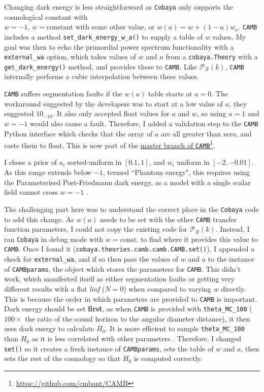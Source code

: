 \documentclass{article}
\begin{document}
Changing dark energy is less straightforward as \texttt{Cobaya} only supports the cosmological constant with \\ $w=-1$, $w = \textrm{constant}$ with some other value, or $w(a) = w+(1-a)w_a$. \texttt{CAMB} includes a method \texttt{set\_dark\_energy\_w\_a()} to supply a table of $w$ values. My goal was then to echo the primordial power spectrum functionality with a \texttt{external\_wa} option, which takes values of $w$ and $a$ from a \texttt{cobaya.Theory} with a \texttt{get\_dark\_energy()} method, and provides these to \texttt{CAMB}. Like $\mathcal P_\mathcal R(k)$, \texttt{CAMB} internally performs a cubic interpolation between these values.

\texttt{CAMB} suffers segmentation faults if the $w(a)$ table starts at $a=0$. The workaround suggested by the developers was to start at a low value of $a$, they suggested $10_{-10}$. It also only accepted float values for $a$ and $w$, so using $a=1$ and $w=-1$ would also cause a fault. Therefore, I added a validation step to the \texttt{CAMB} Python interface which checks that the array of $a$ are all greater than zero, and casts them to float. This is now part of the \href{https://github.com/cmbant/CAMB}{master branch of \texttt{CAMB}}\footnote{\href{https://github.com/cmbant/CAMB}{https://github.com/cmbant/CAMB}}.

I chose a prior of $a_i$ sorted-uniform in $[0.1, 1]$, and $w_i$ uniform in $[-2, -0.01]$. As this range extends below $-1$, termed ``Phantom energy", this requires using the Parameterised Post-Friedmann dark energy, as a model with a single scalar field cannot cross $w=-1$ \cite{PPF}. 

The challenging part here was to understand the correct place in the \texttt{Cobaya} code to add this change. As $w(a)$ needs to be set with the other \texttt{CAMB} transfer function parameters, I could not copy the existing code for $\mathcal P_\mathcal R(k)$. Instead, I ran \texttt{Cobaya} in debug mode with $w=\textrm{const.}$ to find where it provides this value to \texttt{CAMB}. Once I found it (\texttt{cobaya.theories.camb.camb.CAMB.set()}), I appended a check for \texttt{external\_wa}, and if so then pass the values of $w$ and $a$ to the instance of \texttt{CAMBparams}, the object which stores the parameters for \texttt{CAMB}. This didn't work, which manifested itself as either segmentation faults or getting very different results with a flat \textit{linf} ($N=0$) when compared to varying $w$ directly. This is because the order in which parameters are provided to \texttt{CAMB} is important. Dark energy should be set \textbf{first}, as when \texttt{CAMB} is provided with \texttt{theta\_MC\_100} ($100 \times$ the ratio of the sound horizon to the angular diameter distance), it then uses dark energy to calculate $H_0$. It is more efficient to sample \texttt{theta\_MC\_100} than $H_0$ as it is less correlated with other parameters \cite{CosmoMCReadMe}. Therefore, I changed \texttt{set()} so it creates a fresh instance of \texttt{CAMBparams}, sets the table of $w$ and $a$, then sets the rest of the cosmology so that $H_0$ is computed correctly.
\end{document}
